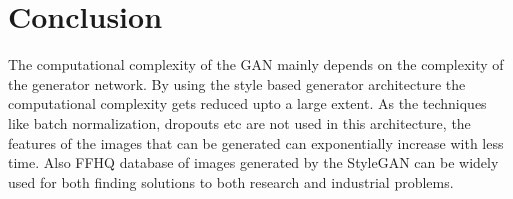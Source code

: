 \chapter{Conclusion}
\label{chapter:conclusion}
\begin{onehalfspace}

The computational complexity of the GAN mainly depends on the complexity of the generator network. By using the style based generator architecture the computational complexity gets reduced upto a large extent. As the techniques like batch normalization, dropouts etc are not used in this architecture, the features of the images that can be generated can exponentially increase with less time. Also FFHQ database of images generated by the StyleGAN can be widely used for both finding solutions to both research and industrial problems. 
\end{onehalfspace}